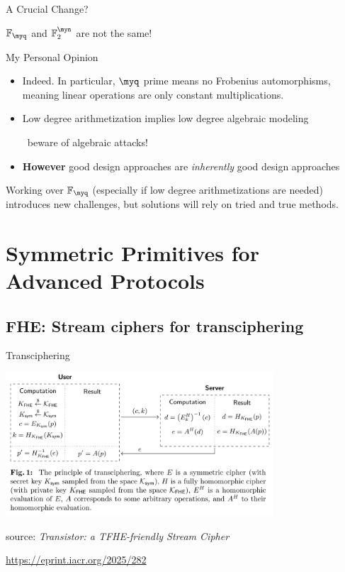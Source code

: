 \documentclass[presentation,aspectratio=1610]{beamer}
\begin{document}
\begin{frame}{A Crucial Change?}
  \begin{center}
    {\large $\F_\myq$ and $\F_2^\myn$ are not the same!}
  \end{center}

  \pause

  \begin{exampleblock}{My Personal Opinion}
    \begin{itemize}
      \setlength\itemsep{0.3cm}
    \item Indeed. \pause In particular, $\myq$ prime means no Frobenius automorphisms, meaning linear operations are only \alert{constant multiplications}.
      \pause
    \item Low degree arithmetization implies low degree algebraic modeling

      ~\hfill \alert{beware of algebraic attacks!}
      \pause
    \item \textbf{However} good design approaches are \emph{inherently} good design approaches
    \end{itemize}

    \pause

    \begin{center}
      Working over $\mathbb{F}_\myq$ (especially if low degree arithmetizations are needed) introduces new challenges, \alert{but solutions will rely on tried and true methods}.
    \end{center}
  \end{exampleblock}
\end{frame}


\section{Symmetric Primitives for Advanced Protocols}

\subsection{FHE: Stream ciphers for transciphering}



\begin{frame}{Transciphering}
  \begin{center}
    \includegraphics[width=10cm]{./figures/transciphering}

    {\small source: \emph{Transistor: a TFHE-friendly Stream Cipher}

      \url{https://eprint.iacr.org/2025/282}}
  \end{center}
\end{frame}
\end{document}
